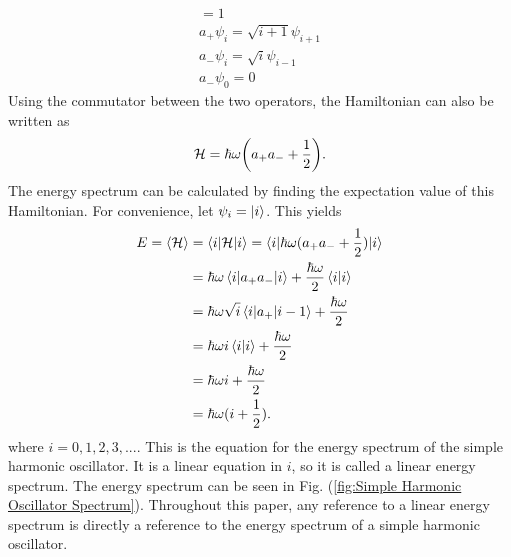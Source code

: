 \begin{gather}
    [a_-,a_+]=1\\
    a_+\psi_i=\sqrt{i+1} \psi_{i+1}\\
    a_-\psi_i=\sqrt{i}\psi_{i-1}\\
    a_-\psi_0=0
\end{gather}
Using the commutator between the two operators, the Hamiltonian can also be written as 
\begin{equation}
    \mathcal{H}=\hbar\omega\qty(a_+a_-+\frac{1}{2}).
\end{equation}
The energy spectrum can be calculated by finding the expectation value of this Hamiltonian. For convenience, let $\psi_i=\ket{i}$. This yields 
\begin{align}
    E=\left<{\mathcal{H}}\right>&=\braket{i|\mathcal{H}|i}=\braket{i|\hbar\omega (a_+a_-+\frac{1}{2})|i}\nonumber\\
    &=\hbar\omega \braket{i|a_+a_-|i}+\frac{\hbar\omega}{2}\braket{i|i}\nonumber\\
    &=\hbar\omega \sqrt{i}\braket{i|a_+|i-1}+\frac{\hbar\omega}{2}\nonumber\\
    &=\hbar\omega i \braket{i|i}+\frac{\hbar\omega}{2}\nonumber\\
    &=\hbar\omega i +\frac{\hbar\omega}{2}\nonumber\\
    &=\hbar\omega(i+\frac{1}{2}).
\end{align}
where $i=0,1,2,3,...$. This is the equation for the energy spectrum of the simple harmonic oscillator. It is a linear equation in $i$, so it is called a linear energy spectrum. The energy spectrum can be seen in Fig. (\ref{fig:Simple Harmonic Oscillator Spectrum}).
Throughout this paper, any reference to a linear energy spectrum is directly a reference to the energy spectrum of a simple harmonic oscillator.

